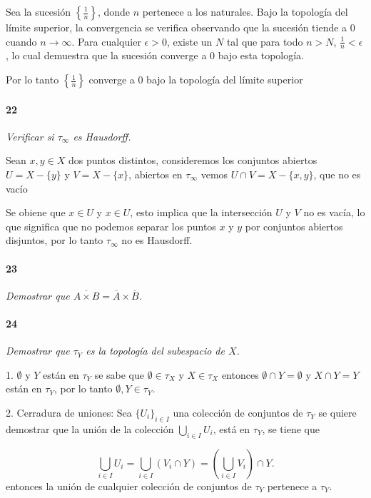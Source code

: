 \documentclass[12pt]{article}
\begin{document}
Sea la sucesi\'on \(\left\{\frac{1}{n}\right\}\), donde \(n\) pertenece a los naturales. Bajo la topolog\'ia del l\'imite superior, la convergencia se verifica observando que la sucesi\'on tiende a 0 cuando \(n \to \infty\). Para cualquier \(\epsilon > 0\), existe un \(N\) tal que para todo \(n > N\), \(\frac{1}{n} < \epsilon\), lo cual demuestra que la sucesión converge a 0 bajo esta topolog\'ia. 

Por lo tanto \(\left\{\frac{1}{n}\right\}\) converge a 0 bajo la topolog\'ia del l\'imite superior

\paragraph{22}
\textit{Verificar si \(\tau_{\infty}\) es Hausdorff.}

Sean \(x, y \in X\) dos puntos distintos, consideremos los conjuntos abiertos \(U = X - \{y\}\) y \(V = X - \{x\}\), abiertos en \(\tau_{\infty}\)
vemos \(U \cap V = X - \{x, y\}\), que no es vac\'io

Se obiene que \(x \in U\) y \(x \in U\), esto implica que la intersecci\'on \(U\) y \(V\) no es vacía, lo que significa que no podemos separar los puntos
\(x\) y \(y\) por conjuntos abiertos disjuntos, por lo tanto \(\tau_{\infty}\) no es Hausdorff.

\paragraph{23}
\textit{Demostrar que \(\overline{A \times B} = \overline{A} \times \overline{B}\).}

\paragraph{24}
\textit{Demostrar que \(\tau_Y\) es la topología del subespacio de \( X \).}

1. \( \emptyset \) y \( Y \) est\'an en \( \tau_Y \) se sabe que \( \emptyset \in \tau_X \) y \( X \in \tau_X \)
entonces \( \emptyset \cap Y = \emptyset \) y \( X \cap Y = Y \) están en \( \tau_Y \), por lo tanto \( \emptyset, Y \in \tau_Y \).

2. Cerradura de uniones: Sea \( \{ U_i \}_{i \in I} \) una colecci\'on de conjuntos de \( \tau_Y \)
se quiere demostrar que la unión de la colecci\'on \( \bigcup_{i \in I} U_i \), está en \( \tau_Y \), se tiene que

\[
\bigcup_{i \in I} U_i = \bigcup_{i \in I} (V_i \cap Y) = \left( \bigcup_{i \in I} V_i \right) \cap Y.
\]
entonces la unión de cualquier colecci\'on de conjuntos de \( \tau_Y \) pertenece a \( \tau_Y \).
\end{document}

